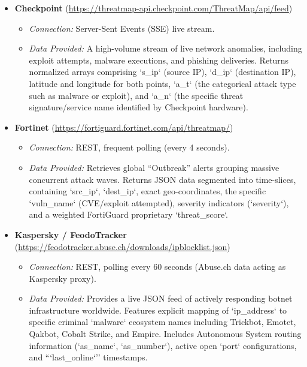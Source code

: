 \documentclass[12pt,a4paper]{article}
\begin{document}
\begin{itemize}[leftmargin=*]
    \item \textbf{Checkpoint} (\url{https://threatmap-api.checkpoint.com/ThreatMap/api/feed})
    \begin{itemize}[noitemsep]
        \item \textit{Connection:} Server-Sent Events (SSE) live stream.
        \item \textit{Data Provided:} A high-volume stream of live network anomalies, including exploit attempts, malware executions, and phishing deliveries. Returns normalized arrays comprising `s_ip` (source IP), `d_ip` (destination IP), latitude and longitude for both points, `a_t` (the categorical attack type such as malware or exploit), and `a_n` (the specific threat signature/service name identified by Checkpoint hardware).
    \end{itemize}
    \vspace{0.3cm}

    \item \textbf{Fortinet} (\url{https://fortiguard.fortinet.com/api/threatmap/})
    \begin{itemize}[noitemsep]
        \item \textit{Connection:} REST, frequent polling (every 4 seconds).
        \item \textit{Data Provided:} Retrieves global ``Outbreak'' alerts grouping massive concurrent attack waves. Returns JSON data segmented into time-slices, containing `src_ip`, `dest_ip`, exact geo-coordinates, the specific `vuln_name` (CVE/exploit attempted), severity indicators (`severity`), and a weighted FortiGuard proprietary `threat_score`.
    \end{itemize}
    \vspace{0.3cm}

    \item \textbf{Kaspersky / FeodoTracker} (\url{https://feodotracker.abuse.ch/downloads/ipblocklist.json})
    \begin{itemize}[noitemsep]
        \item \textit{Connection:} REST, polling every 60 seconds (Abuse.ch data acting as Kaspersky proxy).
        \item \textit{Data Provided:} Provides a live JSON feed of actively responding botnet infrastructure worldwide. Features explicit mapping of `ip_address` to specific criminal `malware` ecosystem names including Trickbot, Emotet, Qakbot, Cobalt Strike, and Empire. Includes Autonomous System routing information (`as_name`, `as_number`), active open `port` configurations, and ```last_online`'' timestamps.
    \end{itemize}
    \vspace{0.3cm}


\end{itemize}
\end{document}
